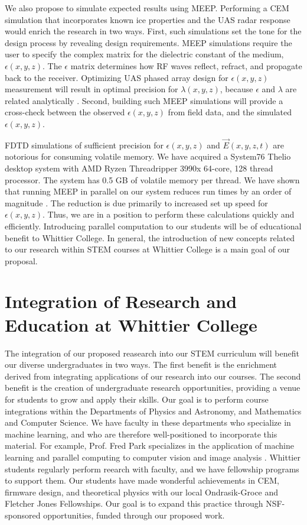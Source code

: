 \documentclass[11pt]{amsart}
\begin{document}
We also propose to simulate expected results using MEEP.  Performing a CEM simulation that incorporates known ice properties and the UAS radar response would enrich the research in two ways.  First, such simulations set the tone for the design process by revealing design requirements.  MEEP simulations require the user to specify the complex matrix for the dielectric constant of the medium, $\epsilon(x,y,z)$.  The $\epsilon$ matrix  determines how RF waves reflect, refract, and propagate back to the receiver.  Optimizing UAS phased array design for $\epsilon(x,y,z)$ measurement will result in optimal precision for $\lambda(x,y,z)$, because $\epsilon$ and $\lambda$ are related analytically \cite{10.3189/2015jog14j214}.  Second, building such MEEP simulations will provide a cross-check between the observed $\epsilon(x,y,z)$ from field data, and the simulated $\epsilon(x,y,z)$. 

FDTD simulations of sufficient precision for $\epsilon(x,y,z)$ and $\vec{E}(x,y,z,t)$ are notorious for consuming volatile memory.  We have acquired a System76 Thelio desktop system with AMD Ryzen Threadripper 3990x 64-core, 128 thread processor.  The system has 0.5 GB of volatile memory per thread.  We have shown that running MEEP in parallel on our system reduces run times by an order of magnitude \cite{meepcon2022}.  The reduction is due primarily to increased set up speed for $\epsilon(x,y,z)$.  Thus, we are in a position to perform these calculations quickly and efficiently.  Introducing parallel computation to our students will be of educational benefit to Whittier College.  In general, the introduction of new concepts related to our research within STEM courses at Whittier College is a main goal of our proposal.

\section{Integration of Research and Education at Whittier College}
\label{sec:int}

The integration of our proposed reasearch into our STEM curriculum will benefit our diverse undergraduates in two ways.  The first benefit is the enrichment derived from integrating applications of our research into our courses.  The second benefit is the creation of undergraduate research opportunities, providing a venue for students to grow and apply their skills.  Our goal is to perform course integrations within the Departments of Physics and Astronomy, and Mathematics and Computer Science.  We have faculty in these departments who specialize in machine learning, and who are therefore well-positioned to incorporate this material.  For example, Prof. Fred Park specializes in the application of machine learning and parallel computing to computer vision and image analysis \cite{SHI201528,doi:10.1137/20M1337041}.  Whittier students regularly perform reearch with faculty, and we have fellowship programs to support them.  Our students have made wonderful achievements in CEM, firmware design, and theoretical physics with our local Ondrasik-Groce and Fletcher Jones Fellowships.  Our goal is to expand this practice through NSF-sponsored opportunities, funded through our proposed work.
\end{document}
